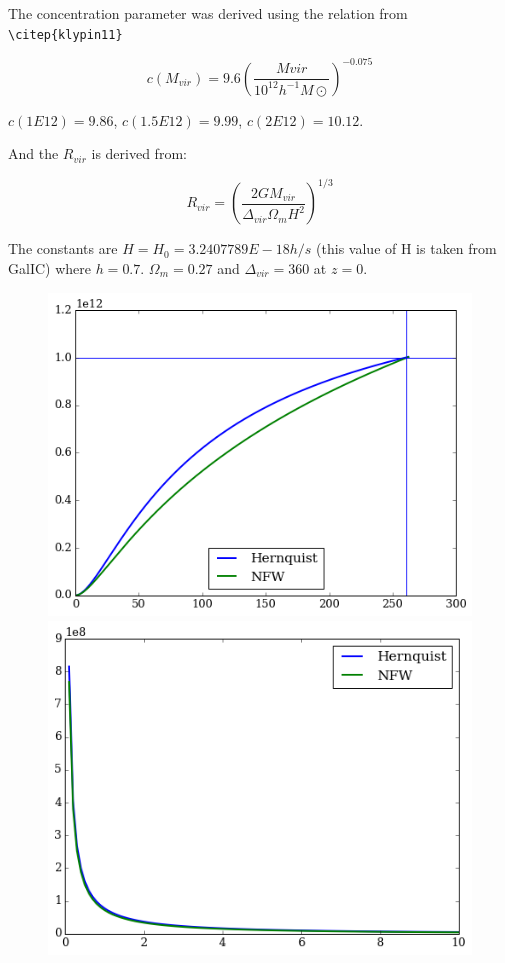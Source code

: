 The concentration parameter was derived using the relation from 
\verb+\citep{klypin11}+

\begin{equation}
c(M_{vir}) = 9.6(\dfrac{Mvir}{10^12 h^{-1} M\odot})^{-0.075}
\end{equation}

$c(1E12) = 9.86$, $c(1.5E12) = 9.99$, $c(2E12) = 10.12$. 

And the $R_{vir}$ is derived from:

\begin{equation}
R_{vir} = \left( \dfrac{2 G M_{vir} }{\Delta_{vir} \Omega_m H^2 } \right)^{1/3}
\end{equation}

The constants are $H = H_0 = 3.2407789E-18 h/s$ (this value of H is taken 
from GalIC) where $h=0.7$. $\Omega_m = 0.27$ and $\Delta_{vir}=360$ at $z=0$. 

\begin{figure}[H]
\centering
\includegraphics[scale=0.4]{MW_enclosedM.png}
\includegraphics[scale=0.4]{MW_enclosedRho.png}
\end{figure}

